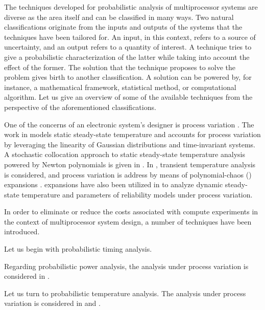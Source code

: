 The techniques developed for probabilistic analysis of multiprocessor systems
are diverse as the area itself and can be classified in many ways. Two natural
classifications originate from the inputs and outputs of the systems that the
techniques have been tailored for. An input, in this context, refers to a source
of uncertainty, and an output refers to a quantity of interest. A technique
tries to give a probabilistic characterization of the latter while taking into
account the effect of the former. The solution that the technique proposes to
solve the problem gives birth to another classification. A solution can be
powered by, for instance, a mathematical framework, statistical method, or
computational algorithm. Let us give an overview of some of the available
techniques from the perspective of the aforementioned classifications.

One of the concerns of an electronic system's designer is process variation
\cite{srivastava2005}. The work in \cite{juan2012} models static steady-state
temperature and accounts for process variation by leveraging the linearity of
Gaussian distributions and time-invariant systems. A stochastic collocation
approach \cite{xiu2010} to static steady-state temperature analysis powered by
Newton polynomials is given in \cite{lee2013}. In \cite{ukhov2014}, transient
temperature analysis is considered, and process variation is address by means of
polynomial-chaos () expansions \cite{xiu2010}.  expansions
have also been utilized in \cite{ukhov2015} to analyze dynamic steady-state
temperature and parameters of reliability models under process variation.

In order to eliminate or reduce the costs associated with compute experiments in
the context of multiprocessor system design, a number of techniques have been
introduced.

Let us begin with probabilistic timing analysis.

Regarding probabilistic power analysis, the analysis under process variation is
considered in \cite{ukhov2014}.

Let us turn to probabilistic temperature analysis. The analysis under process
variation is considered in \cite{ukhov2014} and \cite{ukhov2015}.

